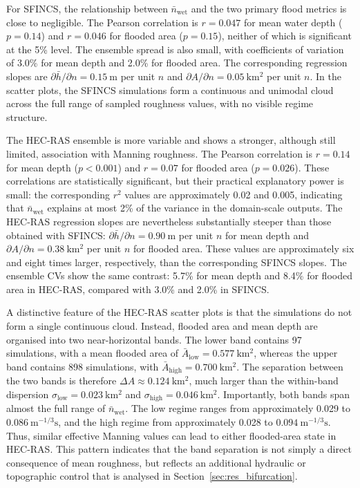\documentclass[a4paper,fleqn]{cas-sc}
\newcommand{\sfincs}{\textsc{SFINCS}}
\newcommand{\hecras}{\textsc{HEC-RAS}}
\begin{document}
For \sfincs{}, the relationship between $\bar{n}_{\mathrm{wet}}$ and the two primary flood metrics is close to negligible. The Pearson correlation is $r=0.047$ for mean water depth ($p=0.14$) and $r=0.046$ for flooded area ($p=0.15$), neither of which is significant at the 5\% level. The ensemble spread is also small, with coefficients of variation of 3.0\% for mean depth and 2.0\% for flooded area. The corresponding regression slopes are $\partial\bar{h}/\partial n = 0.15~\mathrm{m}$ per unit $n$ and
$\partial A/\partial n = 0.05~\mathrm{km^2}$ per unit $n$. In the scatter plots, the \sfincs{} simulations form a continuous and unimodal cloud across the full range of sampled roughness values, with no visible regime structure.

The \hecras{} ensemble is more variable and shows a stronger, although still limited, association with Manning roughness. The Pearson correlation is $r=0.14$ for mean depth ($p<0.001$) and $r=0.07$ for flooded area ($p=0.026$). These correlations are statistically significant, but their practical explanatory power is small: the corresponding $r^2$ values are approximately 0.02 and 0.005, indicating that $\bar{n}_{\mathrm{wet}}$ explains at most 2\% of the variance in the domain-scale outputs. The \hecras{} regression slopes are nevertheless substantially steeper than those obtained with \sfincs{}: $\partial\bar{h}/\partial n = 0.90~\mathrm{m}$ per unit $n$ for mean depth and $\partial A/\partial n = 0.38~\mathrm{km^2}$ per unit $n$ for flooded area. These values are approximately six and eight times larger, respectively, than the corresponding \sfincs{} slopes. The ensemble CVs show the same contrast: 5.7\% for mean depth and 8.4\% for flooded area in \hecras{}, compared with 3.0\% and 2.0\% in \sfincs{}.

A distinctive feature of the \hecras{} scatter plots is that the simulations do not form a single continuous cloud. Instead, flooded area and mean depth are organised into two near-horizontal bands. The lower band contains 97 simulations, with a mean flooded area of $\bar{A}_{\mathrm{low}}=0.577~\mathrm{km^2}$, whereas the upper band contains
898 simulations, with $\bar{A}_{\mathrm{high}}=0.700~\mathrm{km^2}$. The separation between the two bands is therefore $\Delta A \approx 0.124~\mathrm{km^2}$, much larger than the within-band dispersion $\sigma_{\mathrm{low}}=0.023~\mathrm{km^2}$ and $\sigma_{\mathrm{high}}=0.046~\mathrm{km^2}$. Importantly, both bands span almost the full range of $\bar{n}_{\mathrm{wet}}$. The low regime ranges from approximately 0.029 to $0.086~\mathrm{m^{-1/3}s}$, and the high regime from approximately 0.028 to $0.094~\mathrm{m^{-1/3}s}$. Thus, similar effective Manning values can lead to either flooded-area state in \hecras{}. This pattern indicates that the band separation is not simply a direct consequence of mean roughness, but reflects an additional hydraulic or topographic control that is analysed in Section~\ref{sec:res_bifurcation}.
\end{document}
